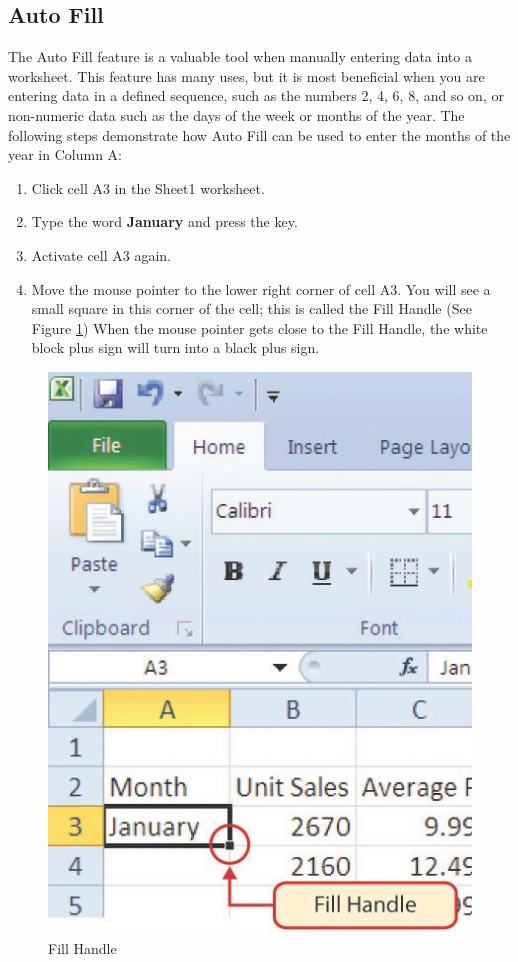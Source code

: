 \subsection{Auto Fill}

The Auto Fill feature is a valuable tool when manually entering data into a worksheet. This feature has many uses, but it is most beneficial when you are entering data in a defined sequence, such as the numbers 2, 4, 6, 8, and so on, or non-numeric data such as the days of the week or months of the year. The following steps demonstrate how Auto Fill can be used to enter the months of the year in Column A:

\begin{enumerate}
	\item Click cell \textsf{A3} in the Sheet1 worksheet.
	\item Type the word \textbf{January} and press the  key.
	\item Activate cell \textsf{A3} again.
	\item Move the mouse pointer to the lower right corner of cell \textsf{A3}. You will see a small square in this corner of the cell; this is called the Fill Handle (See Figure \ref{01:fig18}) When the mouse pointer gets close to the Fill Handle, the white block plus sign will turn into a black plus sign.
\end{enumerate}

\begin{figure}[H]
	\centering
	\includegraphics[width=\maxwidth{.95\linewidth}]{gfx/ch01_fig18}
	\caption{Fill Handle}
	\label{01:fig18}
\end{figure}

